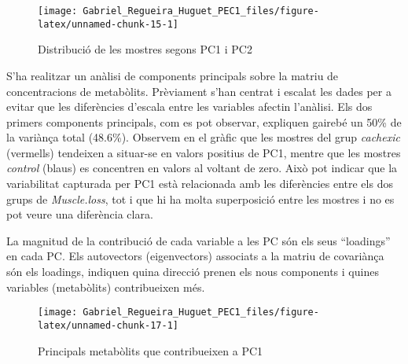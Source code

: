 \documentclass[
]{article}
\newenvironment{Shaded}{\begin{snugshade}}{\end{snugshade}}
\newcommand{\AttributeTok}[1]{\textcolor[rgb]{0.13,0.29,0.53}{#1}}
\newcommand{\CommentTok}[1]{\textcolor[rgb]{0.56,0.35,0.01}{\textit{#1}}}
\newcommand{\ConstantTok}[1]{\textcolor[rgb]{0.56,0.35,0.01}{#1}}
\newcommand{\FunctionTok}[1]{\textcolor[rgb]{0.13,0.29,0.53}{\textbf{#1}}}
\newcommand{\NormalTok}[1]{#1}
\newcommand{\OtherTok}[1]{\textcolor[rgb]{0.56,0.35,0.01}{#1}}
\newcommand{\SpecialCharTok}[1]{\textcolor[rgb]{0.81,0.36,0.00}{\textbf{#1}}}
\begin{document}
\begin{figure}

{\centering \texttt{[image: Gabriel\_Regueira\_Huguet\_PEC1\_files/figure-latex/unnamed-chunk-15-1]} 

}

\caption{Distribució de les mostres segons PC1 i PC2}\label{fig:unnamed-chunk-15}
\end{figure}

S'ha realitzar un anàlisi de components principals sobre la matriu de
concentracions de metabòlits. Prèviament s'han centrat i escalat les
dades per a evitar que les diferències d'escala entre les variables
afectin l'anàlisi. Els dos primers components principals, com es pot
observar, expliquen gairebé un 50\% de la variànça total (48.6\%).
Observem en el gràfic que les mostres del grup \emph{cachexic}
(vermells) tendeixen a situar-se en valors positius de PC1, mentre que
les mostres \emph{control} (blaus) es concentren en valors al voltant de
zero. Això pot indicar que la variabilitat capturada per PC1 està
relacionada amb les diferències entre els dos grups de
\emph{Muscle.loss}, tot i que hi ha molta superposició entre les mostres
i no es pot veure una diferència clara.

La magnitud de la contribució de cada variable a les PC són els seus
``loadings'' en cada PC. Els autovectors (eigenvectors) associats a la
matriu de covariànça són els loadings, indiquen quina direcció prenen
els nous components i quines variables (metabòlits) contribueixen més.

\begin{Shaded}
\end{Shaded}

\begin{figure}

{\centering \texttt{[image: Gabriel\_Regueira\_Huguet\_PEC1\_files/figure-latex/unnamed-chunk-17-1]} 

}

\caption{Principals metabòlits que contribueixen a PC1}\label{fig:unnamed-chunk-17}
\end{figure}
\end{document}
